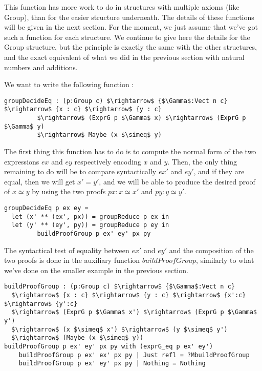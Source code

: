 This function has more work to do in structures with multiple axioms (like Group), than for the easier structure underneath.
The details of these functions will be given in the next section. For the moment, we just assume that we've got such a function for each structure. We continue to give here the details for the Group structure, but the principle is exactly the same with the other structures, and the exact equivalent of what we did in the previous section with natural numbers and additions.

We want to write the following function :


\begin{lstlisting}
groupDecideEq : (p:Group c) $\rightarrow$ {$\Gamma$:Vect n c} $\rightarrow$ {x : c} $\rightarrow$ {y : c} 
	     $\rightarrow$ (ExprG p $\Gamma$ x) $\rightarrow$ (ExprG p $\Gamma$ y) 
	     $\rightarrow$ Maybe (x $\simeq$ y)
\end{lstlisting}

The first thing this function has to do is to compute the normal form of the two expressions $ex$ and $ey$ respectively encoding $x$ and $y$.
Then, the only thing remaining to do will be to compare syntactically $ex'$ and $ey'$, and if they are equal, then we will get $x'=y'$, and we will be able to produce the desired proof of $x \simeq y$ by using the two proofs $px : x \simeq x'$ and $py : y \simeq y'$. 


\begin{lstlisting}
groupDecideEq p ex ey =
  let (x' ** (ex', px)) = groupReduce p ex in
  let (y' ** (ey', py)) = groupReduce p ey in
	     buildProofGroup p ex' ey' px py
\end{lstlisting}


The syntactical test of equality between $ex'$ and $ey'$ and the composition of the two proofs is done in the auxiliary function $buildProofGroup$, similarly to what we've done on the smaller example in the previous section. 


\begin{lstlisting}
buildProofGroup : (p:Group c) $\rightarrow$ {$\Gamma$:Vect n c} 
  $\rightarrow$ {x : c} $\rightarrow$ {y : c} $\rightarrow$ {x':c} $\rightarrow$ {y':c} 
  $\rightarrow$ (ExprG p $\Gamma$ x') $\rightarrow$ (ExprG p $\Gamma$ y') 
  $\rightarrow$ (x $\simeq$ x') $\rightarrow$ (y $\simeq$ y') 
  $\rightarrow$ (Maybe (x $\simeq$ y))
buildProofGroup p ex' ey' px py with (exprG_eq p ex' ey')
    buildProofGroup p ex' ex' px py | Just refl = ?MbuildProofGroup
    buildProofGroup p ex' ey' px py | Nothing = Nothing
\end{lstlisting}

